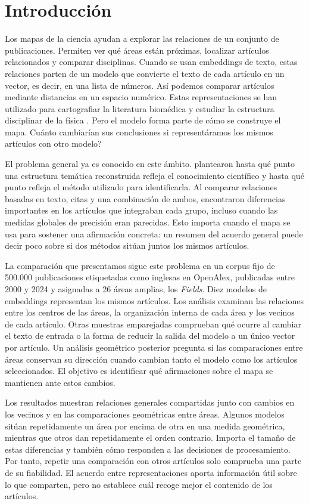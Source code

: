 \documentclass[12pt]{article}
\begin{document}
\section{Introducción}
Los mapas de la ciencia ayudan a explorar las relaciones de un conjunto de publicaciones. Permiten ver qué áreas están próximas, localizar artículos relacionados y comparar disciplinas. Cuando se usan embeddings de texto, estas relaciones parten de un modelo que convierte el texto de cada artículo en un vector, es decir, en una lista de números. Así podemos comparar artículos mediante distancias en un espacio numérico. Estas representaciones se han utilizado para cartografiar la literatura biomédica y estudiar la estructura disciplinar de la física \citep{refbe130e2973,refc0e2cc29e0}. Pero el modelo forma parte de cómo se construye el mapa. \textquestiondown{}Cuánto cambiarían sus conclusiones si representáramos los mismos artículos con otro modelo?

El problema general ya es conocido en este ámbito. \citet{refa0d2d707e6} plantearon hasta qué punto una estructura temática reconstruida refleja el conocimiento científico y hasta qué punto refleja el método utilizado para identificarla. Al comparar relaciones basadas en texto, citas y una combinación de ambos, \citet{ref6a2f5912bc} encontraron diferencias importantes en los artículos que integraban cada grupo, incluso cuando las medidas globales de precisión eran parecidas. Esto importa cuando el mapa se usa para sostener una afirmación concreta: un resumen del acuerdo general puede decir poco sobre si dos métodos sitúan juntos los mismos artículos.

La comparación que presentamos sigue este problema en un corpus fijo de 500.000 publicaciones etiquetadas como inglesas en OpenAlex, publicadas entre 2000 y 2024 y asignadas a 26 áreas amplias, los \emph{Fields}. Diez modelos de embeddings representan los mismos artículos. Los análisis examinan las relaciones entre los centros de las áreas, la organización interna de cada área y los vecinos de cada artículo. Otras muestras emparejadas comprueban qué ocurre al cambiar el texto de entrada o la forma de reducir la salida del modelo a un único vector por artículo. Un análisis geométrico posterior pregunta si las comparaciones entre áreas conservan su dirección cuando cambian tanto el modelo como los artículos seleccionados. El objetivo es identificar qué afirmaciones sobre el mapa se mantienen ante estos cambios.

Los resultados muestran relaciones generales compartidas junto con cambios en los vecinos y en las comparaciones geométricas entre áreas. Algunos modelos sitúan repetidamente un área por encima de otra en una medida geométrica, mientras que otros dan repetidamente el orden contrario. Importa el tamaño de estas diferencias y también cómo responden a las decisiones de procesamiento. Por tanto, repetir una comparación con otros artículos solo comprueba una parte de su fiabilidad. El acuerdo entre representaciones aporta información útil sobre lo que comparten, pero no establece cuál recoge mejor el contenido de los artículos.
\end{document}
